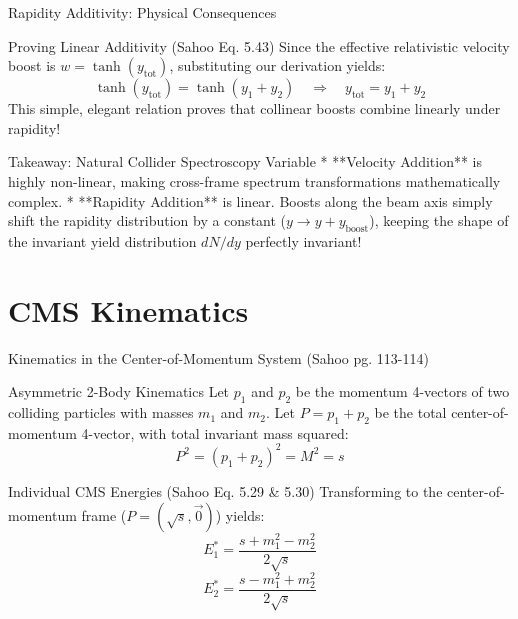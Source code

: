 \documentclass[aspectratio=169]{beamer}
\begin{document}
\begin{frame}{Rapidity Additivity: Physical Consequences}
    \begin{block}{Proving Linear Additivity (Sahoo Eq. 5.43)}
        Since the effective relativistic velocity boost is $w = \tanh(y_{\text{tot}})$, substituting our derivation yields:
        \[ \tanh(y_{\text{tot}}) = \tanh(y_1 + y_2) \quad \Rightarrow \quad y_{\text{tot}} = y_1 + y_2 \]
        This simple, elegant relation proves that collinear boosts combine linearly under rapidity!
    \end{block}
    \begin{alertblock}{Takeaway: Natural Collider Spectroscopy Variable}
        * **Velocity Addition** is highly non-linear, making cross-frame spectrum transformations mathematically complex.
        * **Rapidity Addition** is linear. Boosts along the beam axis simply shift the rapidity distribution by a constant ($y \rightarrow y + y_{\text{boost}}$), keeping the shape of the invariant yield distribution $dN/dy$ perfectly invariant!
    \end{alertblock}
\end{frame}

\section{CMS Kinematics}

\begin{frame}{Kinematics in the Center-of-Momentum System (Sahoo pg. 113-114)}
    \begin{block}{Asymmetric 2-Body Kinematics}
        Let $p_1$ and $p_2$ be the momentum 4-vectors of two colliding particles with masses $m_1$ and $m_2$. Let $P = p_1 + p_2$ be the total center-of-momentum 4-vector, with total invariant mass squared:
        \[ P^2 = (p_1 + p_2)^2 = M^2 = s \]
    \end{block}
    \begin{block}{Individual CMS Energies (Sahoo Eq. 5.29 \& 5.30)}
        Transforming to the center-of-momentum frame ($P = (\sqrt{s}, \vec{0})$) yields:
        \[ E_1^* = \frac{s + m_1^2 - m_2^2}{2\sqrt{s}} \]
        \[ E_2^* = \frac{s - m_1^2 + m_2^2}{2\sqrt{s}} \]
    \end{block}
\end{frame}
\end{document}
